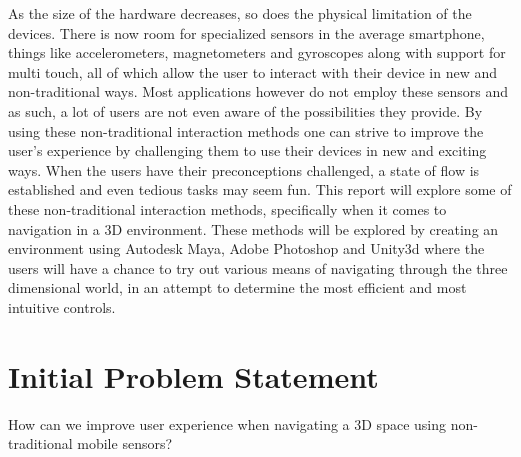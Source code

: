 As the size of the hardware decreases, so does the physical limitation of the devices. There is now room for specialized sensors in the average smartphone, things like accelerometers, magnetometers and gyroscopes along with support for multi touch, all of which allow the user to interact with their device in new and non-traditional ways.
Most applications however do not employ these sensors and as such, a lot of users are not even aware of the possibilities they provide.
By using these non-traditional interaction methods one can strive to improve the user's experience by challenging them to use their devices in new and exciting ways. When the users have their preconceptions challenged, a state of flow is established and even tedious tasks may seem fun.
This report will explore some of these non-traditional interaction methods, specifically when it comes to navigation in a 3D environment.
These methods will be explored by creating an environment using Autodesk Maya, Adobe Photoshop and Unity3d where the users will have a chance to try out various means of navigating through the three dimensional world, in an attempt to determine the most efficient and most intuitive controls.

\section{Initial Problem Statement}
How can we improve user experience when navigating a 3D space using non-traditional mobile sensors?